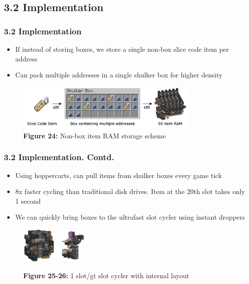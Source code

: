 \documentclass[aspectratio=169]{beamer}
\begin{document}
\subsection{3.2 Implementation}

\begin{frame}
	\frametitle{3.2 Implementation}

    \begin{itemize}
		\item If instead of storing boxes, we store a single non-box slice code item per address
		\item Can pack multiple addresses in a single shulker box for higher density
	\end{itemize}
    \begin{figure}
        \includegraphics[width=0.8\textwidth]{nonboxlayout.png}
        \caption{\textbf{Figure 24:} Non-box item RAM storage scheme}
    \end{figure}
\end{frame}


\begin{frame}
	\frametitle{3.2 Implementation. Contd.}

    \begin{itemize}
		\item Using hoppercarts, can pull items from shulker boxes every game tick
        \item 8x faster cycling than traditional disk drives. Item at the 20th slot takes only 1 second
		\item We can quickly bring boxes to the ultrafast slot cycler using instant droppers
	\end{itemize}
    \begin{figure}
        \includegraphics[width=0.15\textwidth]{slotiter.png}
        \includegraphics[width=0.15\textwidth]{slotintern.png}
        \caption{\textbf{Figure 25-26:} 1 slot/gt slot cycler with internal layout}
    \end{figure}
\end{frame}
\end{document}
